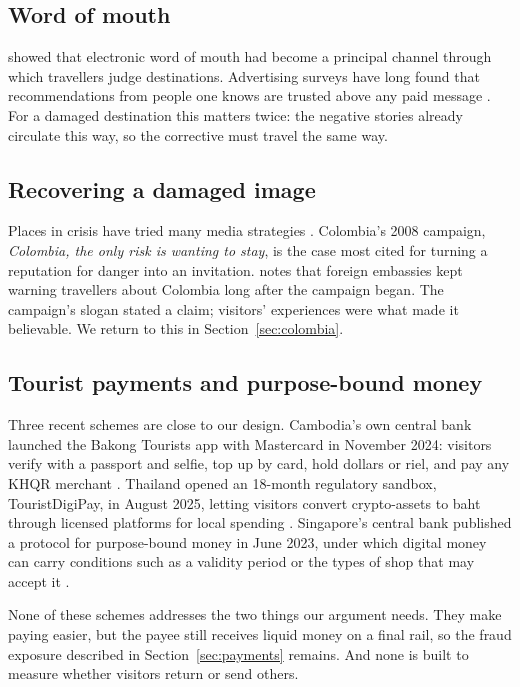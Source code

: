 \documentclass[10pt,letterpaper,twocolumn]{article}
\begin{document}
\subsection{Word of mouth}

\citet{litvin2008} showed that electronic word of mouth had become a principal
channel through which travellers judge destinations. Advertising surveys have
long found that recommendations from people one knows are trusted above any
paid message \citep{nielsen2015}. For a damaged destination this matters twice:
the negative stories already circulate this way, so the corrective must travel
the same way.

\subsection{Recovering a damaged image}

Places in crisis have tried many media strategies \citep{avraham2008}.
Colombia's 2008 campaign, \emph{Colombia, the only risk is wanting to stay}, is
the case most cited for turning a reputation for danger into an invitation.
\citet{fletcher2010} notes that foreign embassies kept warning travellers about
Colombia long after the campaign began. The campaign's slogan stated a claim;
visitors' experiences were what made it believable. We return to this in
Section~\ref{sec:colombia}.

\subsection{Tourist payments and purpose-bound money}

Three recent schemes are close to our design. Cambodia's own central bank
launched the Bakong Tourists app with Mastercard in November 2024: visitors
verify with a passport and selfie, top up by card, hold dollars or riel, and
pay any KHQR merchant \citep{fintechnews2024}. Thailand opened an 18-month
regulatory sandbox, TouristDigiPay, in August 2025, letting visitors convert
crypto-assets to baht through licensed platforms for local spending
\citep{theblock2025}. Singapore's central bank published a protocol for
purpose-bound money in June 2023, under which digital money can carry
conditions such as a validity period or the types of shop that may accept it
\citep{mas2023}.

None of these schemes addresses the two things our argument needs. They make
paying easier, but the payee still receives liquid money on a final rail, so
the fraud exposure described in Section~\ref{sec:payments} remains. And none is
built to measure whether visitors return or send others.
\end{document}
